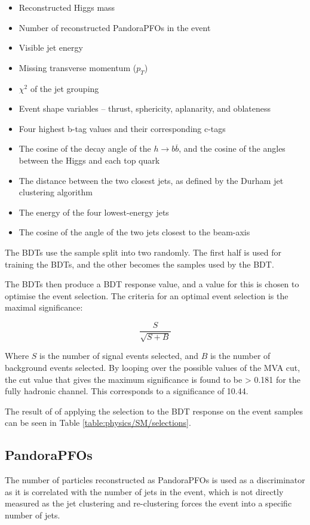 \begin{itemize}
	\item Reconstructed Higgs mass
	\item Number of reconstructed PandoraPFOs in the event
	\item Visible jet energy
	\item Missing transverse momentum ($p_T$)
	\item $\chi^2$ of the jet grouping
	\item Event shape variables -- thrust, sphericity, aplanarity, and oblateness
	\item Four highest b-tag values and their corresponding c-tags
	\item The cosine of the decay angle of the $h \rightarrow b\overline{b}$, and the cosine of the angles between the Higgs and each top quark
	\item The distance between the two closest jets, as defined by the Durham jet clustering algorithm
	\item The energy of the four lowest-energy jets
	\item The cosine of the angle of the two jets closest to the beam-axis
\end{itemize}

The \acrshort{BDT}s use the sample split into two randomly. The first half is used for training the \acrshort{BDT}s, and the other becomes the samples used by the \acrshort{BDT}.

The \acrshort{BDT}s then produce a \acrshort{BDT} response value, and a value for this is chosen to optimise the event selection. The criteria for an optimal event selection is the maximal significance:

\begin{equation}
	\frac{S}{\sqrt{S + B}}
\label{eq:significance}
\end{equation}

Where $S$ is the number of signal events selected, and $B$ is the number of background events selected. By looping over the possible values of the MVA cut, the cut value that gives the maximum significance is found to be > 0.181 for the fully hadronic channel. This corresponds to a significance of 10.44.

The result of of applying the selection to the BDT response on the event samples can be seen in Table \ref{table:physics/SM/selections}.

\subsection{PandoraPFOs}
The number of particles reconstructed as Pandora\acrshort{PFO}s is used as a discriminator as it is correlated with the number of jets in the event, which is not directly measured as the jet clustering and re-clustering forces the event into a specific number of jets. 

